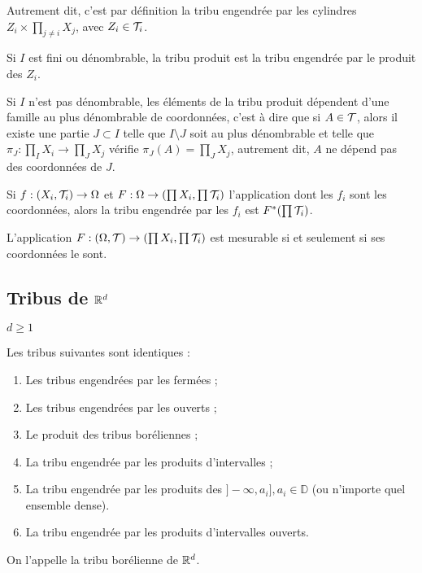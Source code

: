 \documentclass[10pt,a4paper,notitlepage ]{report}
\begin{document}
Autrement dit, c'est par définition la tribu engendrée par les cylindres $Z_i \times \prod_{j \neq i} X_j $, avec $Z_i \in \mathcal T_i $. 


\begin{rem}

Si $I$ est fini ou dénombrable, la tribu produit est la tribu engendrée par le produit des $Z_i$. 

\end{rem}

\begin{rem}
	
Si $I$ n'est pas dénombrable, les éléments de la tribu produit dépendent d'une famille au plus dénombrable de coordonnées, c'est à dire que si $A \in \mathcal T$, alors il existe une partie $J \subset I$ telle que $I \setminus J$ soit au plus dénombrable et telle que $\pi_J : \prod_I X_i \rightarrow \prod_J X_j$ vérifie $\pi_J(A) =\prod_J X_j$, autrement dit, $A$ ne dépend pas des coordonnées de $J$.
\end{rem}

\begin{propriete}

Si $f : (X_i , \mathcal T_i ) \rightarrow \Omega$ et $F : \Omega \rightarrow ( \prod X_i , \prod \mathcal T _i ) $ l'application dont les $f_i$ sont les coordonnées, alors la tribu engendrée par les $f_i$ est $F^*(\prod \mathcal T_i ) $.

\end{propriete}

\begin{propriete}

L'application $F : ( \Omega , \mathcal T ) \rightarrow ( \prod X_i , \prod \mathcal T_i ) $ est mesurable si et seulement si ses coordonnées le sont.

\end{propriete}


\subsection{Tribus de $\mathbb R ^d$}

$d \geq 1 $ \\

\begin{theorem}
Les tribus suivantes sont identiques :
\begin{enumerate}
\item Les tribus engendrées par les fermées ;
\item Les tribus engendrées par les ouverts ;
\item Le produit des tribus boréliennes ;
\item La tribu engendrée par les produits d'intervalles ;
\item La tribu engendrée par les produits des $]-\infty , a_i ], a_i \in \mathbb{D} $ (ou n'importe quel ensemble dense).
\item La tribu engendrée par les produits d'intervalles ouverts. 
\end{enumerate}

On l'appelle la tribu borélienne de $\mathbb R ^d $.

\end{theorem}
\end{document}
